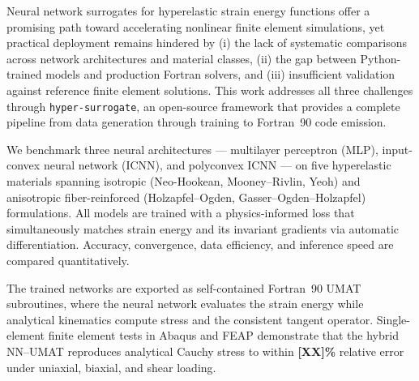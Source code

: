 
Neural network surrogates for hyperelastic strain energy functions offer a
promising path toward accelerating nonlinear finite element simulations, yet
practical deployment remains hindered by (i) the lack of systematic comparisons
across network architectures and material classes, (ii) the gap between
Python-trained models and production Fortran solvers, and (iii) insufficient
validation against reference finite element solutions.  This work addresses all
three challenges through \texttt{hyper-surrogate}, an open-source framework
that provides a complete pipeline from data generation through training to
Fortran~90 code emission.

We benchmark three neural architectures --- multilayer perceptron (MLP),
input-convex neural network (ICNN), and polyconvex ICNN --- on five
hyperelastic materials spanning isotropic (Neo-Hookean, Mooney--Rivlin, Yeoh)
and anisotropic fiber-reinforced (Holzapfel--Ogden, Gasser--Ogden--Holzapfel)
formulations.  All models are trained with a physics-informed loss that
simultaneously matches strain energy and its invariant gradients via automatic
differentiation.  Accuracy, convergence, data efficiency, and inference speed
are compared quantitatively.

The trained networks are exported as self-contained Fortran~90 UMAT
subroutines, where the neural network evaluates the strain energy while
analytical kinematics compute stress and the consistent tangent operator.
Single-element finite element tests in Abaqus and FEAP demonstrate that the
hybrid NN--UMAT reproduces analytical Cauchy stress to within
\textbf{[XX]\%} relative error under uniaxial, biaxial, and shear loading.


